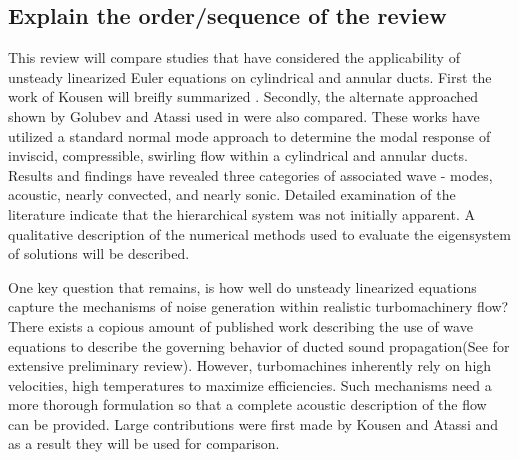 \documentclass[conf]{new-aiaa}
\begin{document}
\subsection{Explain the order/sequence of the review}
This review will compare studies that have considered the applicability of unsteady linearized Euler equations on cylindrical and annular ducts. First the work of Kousen will breifly summarized \cite{Kousen1996,Kousen1999}. Secondly, the alternate approached shown by Golubev and Atassi used in \cite{Golubev1996,Golubev1998} were also compared. These works have utilized a standard normal mode approach to determine the modal response of inviscid, compressible, swirling flow within a cylindrical and annular ducts. Results and findings have revealed three categories of associated wave - modes, acoustic, nearly convected, and nearly sonic. Detailed examination of the literature indicate that the hierarchical system was not initially apparent. A qualitative description of the numerical methods used to evaluate the eigensystem of solutions will be described.

One key question that remains, is how well do unsteady linearized equations capture the mechanisms of noise generation within realistic turbomachinery flow? There exists a copious amount of published work describing the use of wave equations to describe the governing behavior of ducted sound propagation(See \cite{Michel2008} for extensive preliminary review). However, turbomachines inherently rely on high velocities, high temperatures to maximize efficiencies. Such mechanisms need a more thorough formulation so that a complete acoustic description of the flow can be provided. Large contributions were first made by Kousen and Atassi and as a result they will be used for comparison.

\end{document}
